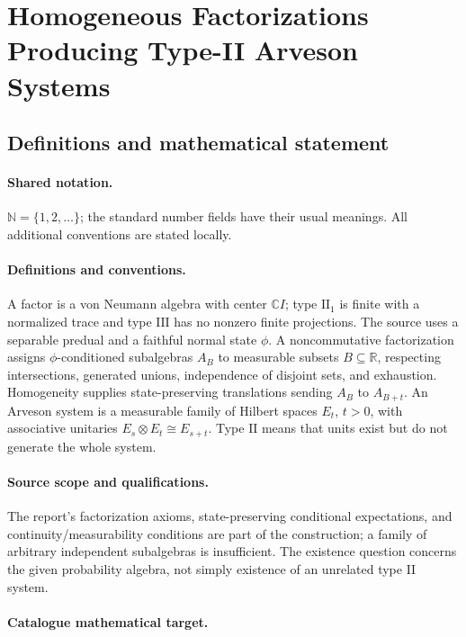 \documentclass[11pt]{article}
\begin{document}
\section{Homogeneous Factorizations Producing Type-II Arveson Systems}\label{statement}

\subsection{Definitions and mathematical statement}

\paragraph{Shared notation.}$\mathbb N=\{1,2,\ldots\}$; the standard number fields have their usual meanings. All additional conventions are stated locally.


\paragraph{Definitions and conventions.} A factor is a von Neumann algebra with center $\mathbb C I$; type $\mathrm{II}_1$ is finite with a normalized trace and type $\mathrm{III}$ has no nonzero finite projections. The source uses a separable predual and a faithful normal state $\phi$. A noncommutative factorization assigns $\phi$-conditioned subalgebras $A_B$ to measurable subsets $B\subseteq\mathbb R$, respecting intersections, generated unions, independence of disjoint sets, and exhaustion. Homogeneity supplies state-preserving translations sending $A_B$ to $A_{B+t}$. An Arveson system is a measurable family of Hilbert spaces $E_t$, $t>0$, with associative unitaries $E_s\otimes E_t\cong E_{s+t}$. Type $\mathrm{II}$ means that units exist but do not generate the whole system.

\paragraph{Source scope and qualifications.} The report's factorization axioms, state-preserving conditional expectations, and continuity/measurability conditions are part of the construction; a family of arbitrary independent subalgebras is insufficient. The existence question concerns the given probability algebra, not simply existence of an unrelated type II system.

\paragraph{Catalogue mathematical target.}
\end{document}
